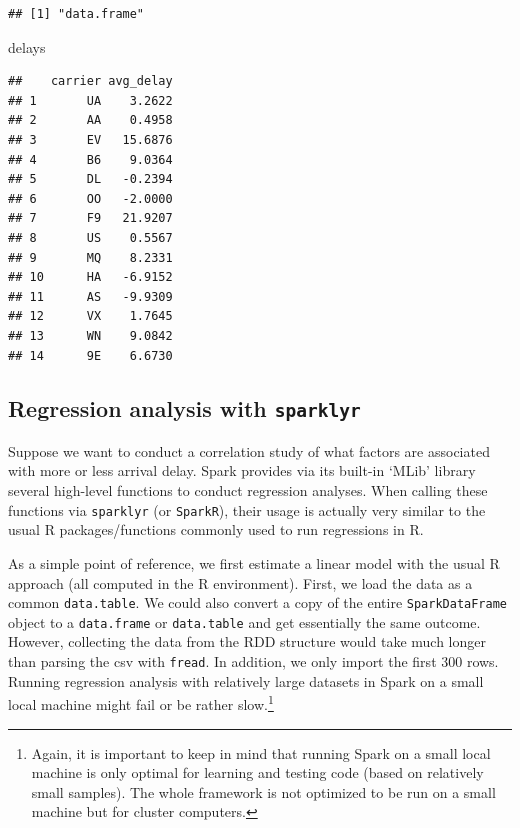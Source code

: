 \documentclass[
  12pt,
]{style/krantz}
\newenvironment{Shaded}{\begin{snugshade}}{\end{snugshade}}
\newcommand{\NormalTok}[1]{#1}
\begin{document}
\begin{verbatim}
## [1] "data.frame"
\end{verbatim}

\begin{Shaded}
\begin{Highlighting}[]
\NormalTok{delays}
\end{Highlighting}
\end{Shaded}

\begin{verbatim}
##    carrier avg_delay
## 1       UA    3.2622
## 2       AA    0.4958
## 3       EV   15.6876
## 4       B6    9.0364
## 5       DL   -0.2394
## 6       OO   -2.0000
## 7       F9   21.9207
## 8       US    0.5567
## 9       MQ    8.2331
## 10      HA   -6.9152
## 11      AS   -9.9309
## 12      VX    1.7645
## 13      WN    9.0842
## 14      9E    6.6730
\end{verbatim}

\hypertarget{regression-analysis-with-sparklyr}{%
\subsection{\texorpdfstring{Regression analysis with \texttt{sparklyr}}{Regression analysis with sparklyr}}\label{regression-analysis-with-sparklyr}}

Suppose we want to conduct a correlation study of what factors are associated with more or less arrival delay. Spark provides via its built-in `MLib' library several high-level functions to conduct regression analyses. When calling these functions via \texttt{sparklyr} (or \texttt{SparkR}), their usage is actually very similar to the usual R packages/functions commonly used to run regressions in R.

As a simple point of reference, we first estimate a linear model with the usual R approach (all computed in the R environment). First, we load the data as a common \texttt{data.table}. We could also convert a copy of the entire \texttt{SparkDataFrame} object to a \texttt{data.frame} or \texttt{data.table} and get essentially the same outcome. However, collecting the data from the RDD structure would take much longer than parsing the csv with \texttt{fread}. In addition, we only import the first 300 rows. Running regression analysis with relatively large datasets in Spark on a small local machine might fail or be rather slow.\footnote{Again, it is important to keep in mind that running Spark on a small local machine is only optimal for learning and testing code (based on relatively small samples). The whole framework is not optimized to be run on a small machine but for cluster computers.}
\end{document}
